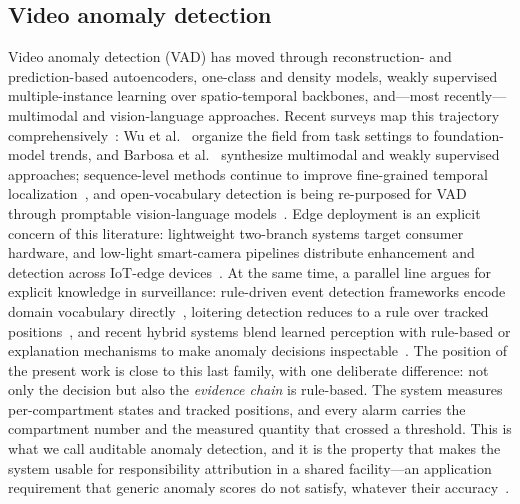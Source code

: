 \documentclass[journal,article,submit,oneauthor]{Definitions/mdpi}
\begin{document}
\subsection{Video anomaly detection}
Video anomaly detection (VAD) has moved through reconstruction- and prediction-based
autoencoders, one-class and density models, weakly supervised multiple-instance learning over
spatio-temporal backbones, and---most recently---multimodal and vision-language
approaches. Recent surveys map this trajectory comprehensively~\cite{duong2023vad,
wu2026vad,barbosa2026survey}: Wu et al.~\cite{wu2026vad} organize the field from task
settings to foundation-model trends, and Barbosa et al.~\cite{barbosa2026survey} synthesize
multimodal and weakly supervised approaches; sequence-level methods continue to improve
fine-grained temporal localization~\cite{zhong2025interclip}, and open-vocabulary detection
is being re-purposed for VAD through promptable vision-language models~\cite{xu2025plovad}.
Edge deployment is an explicit concern of this literature: lightweight two-branch systems
target consumer hardware, and low-light smart-camera pipelines distribute enhancement and
detection across IoT-edge devices~\cite{abuawwad2024lowlight}. At the same time, a parallel
line argues for explicit knowledge in surveillance: rule-driven event detection frameworks
encode domain vocabulary directly~\cite{lim2014isurveillance}, loitering detection reduces to
a rule over tracked positions~\cite{zin2010loitering}, and recent hybrid systems blend
learned perception with rule-based or explanation mechanisms to make anomaly decisions
inspectable~\cite{fu2025iot,natha2025bilstm}. The position of the present work is close to
this last family, with one deliberate difference: not only the decision but also the
\emph{evidence chain} is rule-based. The system measures per-compartment states and tracked
positions, and every alarm carries the compartment number and the measured quantity that
crossed a threshold. This is what we call auditable anomaly detection, and it is the property
that makes the system usable for responsibility attribution in a shared facility---an
application requirement that generic anomaly scores do not satisfy, whatever their
accuracy~\cite{lim2014isurveillance}.
\end{document}
